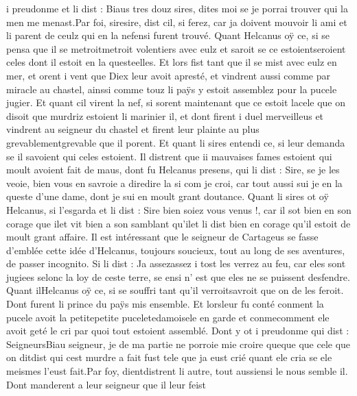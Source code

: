 \documentclass{article}
\begin{document}
\begin{pages}
   i preudonme et li dist :
   Biaus tres douz sires, dites moi se je porrai 
      trouver qui la men me 
      menast.Par foi, siresire, dist cil,
      si ferez, car ja doivent mouvoir li ami et li parent de ceulz qui
      en la nefensi furent trouvé. \pend
\pstart Quant Helcanus oÿ ce, si se pensa que
   il se metroitmetroit volentiers
      avec eulz et saroit se ce estoientseroient
      celes dont il estoit en la questeelles. 
   Et lors fist tant que il se mist avec eulz en mer, et orent i vent 
   que Diex leur avoit apresté, et vindrent aussi comme par miracle au 
   chastel, ainssi comme touz li paÿs 
   y estoit assemblez pour la pucele jugier.
   Et quant cil virent la nef, si sorent maintenant que ce estoit lacele
   que on disoit que murdriz estoient li marinier
      il, et dont firent i duel merveilleus et vindrent au 
   seigneur du chastel
   et firent leur plainte au plus grevablementgrevable que il porent.
   Et quant li sires entendi ce, si leur demanda 
    se il savoient qui celes estoient.  Il distrent que
      ii mauvaises fames estoient
   qui moult avoient fait de maus, dont fu 
   Helcanus presens, qui li dist :
   Sire, se je les veoie, bien vous en savroie a 
      diredire la 
      si com je croi, car tout aussi sui je en la queste d’une dame,
      dont je sui en moult grant doutance.
   Quant li sires ot oÿ Helcanus, 
   si l’esgarda et li dist :
      Sire bien soiez vous venus !, car il sot bien en son corage 
      que ilet vit bien a son samblant qu’ilet li dist bien en corage qu’il 
   estoit de moult grant affaire.
   Il est intéressant que le seigneur de Cartageus se fasse d'emblée cette idée d'Helcanus, toujours
   soucieux, tout au long de ses aventures, de passer incognito.
   Si li dist :
   Ja 
      assezassez i 
      tost les verrez au feu, car eles sont jugiees selonc la loy de ceste terre,
      se ensi n’ est que eles ne se puissent desfendre. \pend
\pstart Quant 
   ilHelcanus oÿ ce, si se souffri
   tant qu'il verroitsavroit que on de les feroit. 
   Dont furent li prince du paÿs mis ensemble. Et lorsleur fu conté 
   conment la pucele avoit 
      la petitepetite
         puceletedamoisele en garde et
      conmecomment ele avoit geté le cri par quoi tout estoient assemblé.
   Dont y ot i preudonme qui dist :
   SeigneursBiau seigneur,
      je de ma partie ne porroie mie croire queque que 
      cele que on ditdist qui cest murdre a fait 
      fust tele que ja eust crié quant ele cria se ele meismes l’eust fait.Par foy, dientdistrent
      li autre, tout aussiensi le nous semble il.
   Dont manderent a leur seigneur que il leur feist 

\end{pages}
\end{document}
